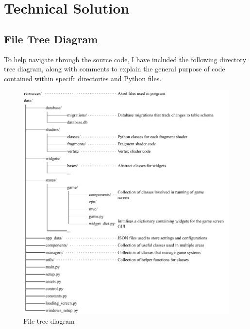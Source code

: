 \documentclass[../main/main.tex]{subfiles}
\begin{document}
\newpage

\chapter{Technical Solution}
\localtableofcontents

\section{File Tree Diagram}
To help navigate through the source code, I have included the following directory tree diagram, along with comments to explain the general purpose of code contained within specifc directories and Python files.

\begin{figure}[H]
    \centering
    \includegraphics[width=\columnwidth]{../technical_solution/assets/file_tree_diagram.pdf}
    \caption{File tree diagram}
    \label{fig:file-tree-diagram}
\end{figure}
\end{document}
